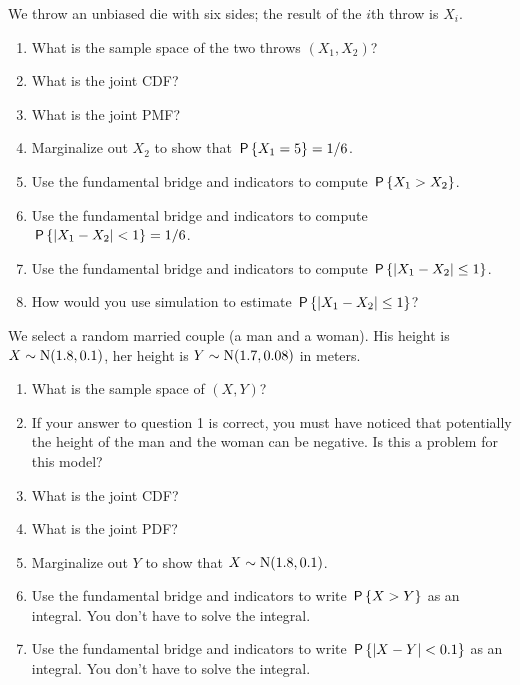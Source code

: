 \documentclass[assignments]{subfiles}
\begin{document}
\begin{exercise}\label{ex:1}
We throw an unbiased die with six sides; the result of the $i$th throw is $X_i$. 
\begin{enumerate}
\item What is the sample space of the two throws $(X_{1}, X_2)$?
\item What is the joint CDF?
\item What is the joint PMF?
\item  Marginalize out $X_2$ to show that $\P{X_1=5} = 1/6$.
\item Use the fundamental bridge and indicators to compute $\P{X_1>X_2}$.
\item Use the fundamental bridge and indicators to compute $\P{|X_1-X_2| < 1 } = 1/6$.
\item Use the fundamental bridge and indicators to compute $\P{|X_1-X_2|\leq 1 }$.
\item How would you use simulation to estimate  $\P{|X_1-X_2|\leq 1 }$?
\end{enumerate}
\end{exercise}

\begin{exercise}
We select a random married couple (a man and a woman). His height is $X\sim \Norm{1.8, 0.1}$, her height is $Y\sim \Norm{1.7, 0.08}$ in meters. 
\begin{enumerate}
\item What is the sample space of $(X, Y)$?
\item If your answer to question 1 is correct, you must have noticed that potentially the height of the man and the woman can be negative. Is this a problem for this model? 
\item What is the joint CDF?
\item What is the joint PDF?
\item  Marginalize out $Y$ to show that $X\sim \Norm{1.8, 0.1}$.
\item Use the fundamental bridge and indicators to write  $\P{X>Y}$ as an integral. You don't have to solve the integral.
\item Use the fundamental bridge and indicators to write  $\P{|X-Y| < 0.1 }$ as an integral. You don't have to solve the integral.
\end{enumerate}
\end{exercise}
\end{document}
